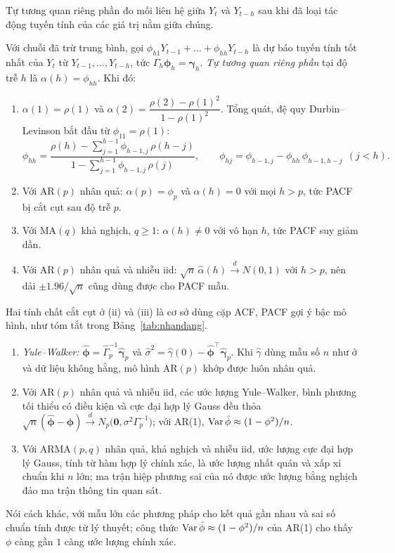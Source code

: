 Tự tương quan riêng phần đo mối liên hệ giữa $Y_t$ và $Y_{t-h}$ sau khi đã loại tác động tuyến tính của các giá trị nằm giữa chúng.
\begin{kq}
Với chuỗi đã trừ trung bình, gọi $\phi_{h1}Y_{t-1}+\dots+\phi_{hh}Y_{t-h}$ là dự báo tuyến tính tốt nhất của $Y_t$ từ $Y_{t-1},\dots,Y_{t-h}$, tức $\Gamma_h\boldsymbol\phi_h=\boldsymbol\gamma_h$. \emph{Tự tương quan riêng phần} tại độ trễ $h$ là $\alpha(h)=\phi_{hh}$. Khi đó:
\begin{enumerate}[label=(\roman*),leftmargin=*,itemsep=1pt]
\item $\alpha(1)=\rho(1)$ và $\alpha(2)=\dfrac{\rho(2)-\rho(1)^2}{1-\rho(1)^2}$. Tổng quát, đệ quy Durbin--Levinson bắt đầu từ $\phi_{11}=\rho(1)$:
\[
\phi_{hh}=\frac{\rho(h)-\sum_{j=1}^{h-1}\phi_{h-1,j}\,\rho(h-j)}{1-\sum_{j=1}^{h-1}\phi_{h-1,j}\,\rho(j)},\qquad
\phi_{hj}=\phi_{h-1,j}-\phi_{hh}\,\phi_{h-1,h-j}\ \ (j<h).
\]
\item Với AR$(p)$ nhân quả: $\alpha(p)=\phi_p$ và $\alpha(h)=0$ với mọi $h>p$, tức PACF bị cắt cụt sau độ trễ $p$.
\item Với MA$(q)$ khả nghịch, $q\ge1$: $\alpha(h)\ne0$ với vô hạn $h$, tức PACF suy giảm dần.
\item Với AR$(p)$ nhân quả và nhiễu iid: $\sqrt n\,\hat\alpha(h)\xrightarrow{d}N(0,1)$ với $h>p$, nên dải $\pm1.96/\sqrt n$ cũng dùng được cho PACF mẫu.
\end{enumerate}
\end{kq}
Hai tính chất cắt cụt ở (ii) và (iii) là cơ sở dùng cặp ACF, PACF gợi ý bậc mô hình, như tóm tắt trong Bảng~\ref{tab:nhandang}.

\begin{kq}
\begin{enumerate}[label=(\roman*),leftmargin=*,itemsep=1pt]
\item \emph{Yule--Walker:} $\hat{\boldsymbol\phi}=\hat\Gamma_p^{-1}\hat{\boldsymbol\gamma}_p$ và $\hat\sigma^2=\hat\gamma(0)-\hat{\boldsymbol\phi}^\top\hat{\boldsymbol\gamma}_p$. Khi $\hat\gamma$ dùng mẫu số $n$ như ở  và dữ liệu không hằng, mô hình AR$(p)$ khớp được luôn nhân quả.
\item Với AR$(p)$ nhân quả và nhiễu iid, các ước lượng Yule--Walker, bình phương tối thiểu có điều kiện và cực đại hợp lý Gauss đều thỏa $\sqrt n(\hat{\boldsymbol\phi}-\boldsymbol\phi)\xrightarrow{d}N_p\bigl(\mathbf0,\sigma^2\Gamma_p^{-1}\bigr)$; với AR(1), $\operatorname{Var}\hat\phi\approx(1-\phi^2)/n$.
\item Với ARMA$(p,q)$ nhân quả, khả nghịch và nhiễu iid, ước lượng cực đại hợp lý Gauss, tính từ hàm hợp lý chính xác, là ước lượng nhất quán và xấp xỉ chuẩn khi $n$ lớn; ma trận hiệp phương sai của nó được ước lượng bằng nghịch đảo ma trận thông tin quan sát.
\end{enumerate}
\end{kq}
Nói cách khác, với mẫu lớn các phương pháp cho kết quả gần nhau và sai số chuẩn tính được từ lý thuyết; công thức $\operatorname{Var}\hat\phi\approx(1-\phi^2)/n$ của AR(1) cho thấy $\phi$ càng gần $1$ càng ước lượng chính xác.

